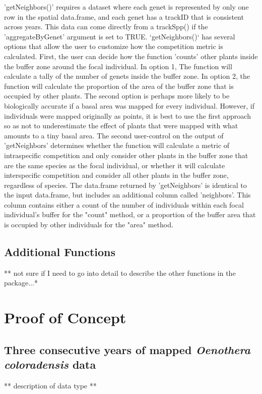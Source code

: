 \documentclass[12pt, letterpaper]{article}
\begin{document}
'getNeighbors()' requires a dataset where each genet is represented by only one row in the spatial data.frame, and each genet has a trackID that is consistent across years. This data can come directly from a trackSpp() if the 'aggregateByGenet' argument is set to TRUE. `getNeighbors()` has several options that allow the user to customize how the competition metric is calculated. First, the user can decide how the function 'counts' other plants inside the buffer zone around the focal individual. In option 1,  The function will calculate a tally of the number of genets inside the buffer zone. In option 2, the function will calculate the proportion of the area of the buffer zone that is occupied by other plants. The second option is perhaps more likely to be biologically accurate if a basal area was mapped for every individual. However, if individuals were mapped originally as points, it is best to use the first approach so as not to underestimate the effect of plants that were mapped with what amounts to a tiny basal area. The second user-control on the output of 'getNeighbors' determines whether the function will calculate a metric of intraspecific competition and only consider other plants in the buffer zone that are the same species as the focal individual,  or whether it will calculate interspecific competition and consider all other plants in the buffer zone, regardless of species. The data.frame returned by 'getNeighbors' is identical to the input data.frame, but includes an additional column called 'neighbors'. This column contains either a count of the number of individuals within each focal individual's buffer for the "count" method, or a proportion of the buffer area that is occupied by other individuals for the "area" method. 

\subsection{Additional Functions}
** not sure if I need to go into detail to describe the other functions in the package...* 

\section{Proof of Concept}
\subsection{Three consecutive years of mapped \textit{Oenothera coloradensis} data}
** description of data type **
\end{document}
